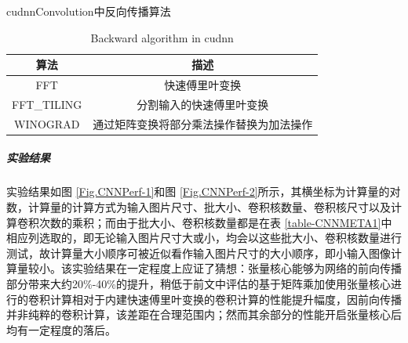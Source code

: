 \begin{table}
	\centering
	\renewcommand{\thetable}{\arabic{section}-\arabic{table} }
	\renewcommand{\tablename}{表}
	\caption{cudnnConvolution中反向传播算法}
	\addtocounter{table}{-1}
	\renewcommand{\thetable}{\arabic{section}-\arabic{table} }
	\renewcommand{\tablename}{Table}
	\caption{Backward algorithm in cudnn}
	\begin{tabular}{cc}
		\toprule
		算法 & 描述\\
		\midrule
		FFT & 快速傅里叶变换\\
		FFT\_TILING & 分割输入的快速傅里叶变换\\
		WINOGRAD & 通过矩阵变换将部分乘法操作替换为加法操作\\
		\bottomrule
	\end{tabular} \label{table-BWDALGO} 
\end{table}
\subparagraph{实验结果}
\par 实验结果如图 \ref{Fig.CNNPerf-1}和图 \ref{Fig.CNNPerf-2}所示，其横坐标为计算量的对数，计算量的计算方式为输入图片尺寸、批大小、卷积核数量、卷积核尺寸以及计算卷积次数的乘积；而由于批大小、卷积核数量都是在表 \ref{table-CNNMETA1}中相应列选取的，即无论输入图片尺寸大或小，均会以这些批大小、卷积核数量进行测试，故计算量大小顺序可被近似看作输入图片尺寸的大小顺序，即小输入图像计算量较小。该实验结果在一定程度上应证了猜想：张量核心能够为网络的前向传播部分带来大约20\%-40\%的提升，稍低于前文中评估的基于矩阵乘加使用张量核心进行的卷积计算相对于内建快速傅里叶变换的卷积计算的性能提升幅度，因前向传播并非纯粹的卷积计算，该差距在合理范围内；然而其余部分的性能开启张量核心后均有一定程度的落后。
